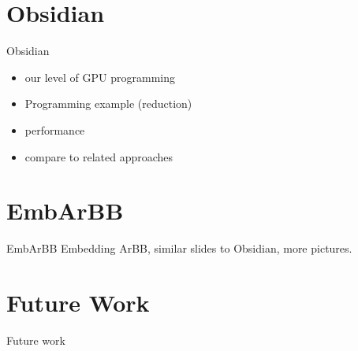 \documentclass[xcolor=dvipsnames]{beamer}
\begin{document}
%
\section{Obsidian}
\begin{frame}{Obsidian} 
  
  \begin{itemize} 
    \item our level of GPU programming 
    \item Programming example  (reduction) 
    \item performance 
    \item compare to related approaches 
  \end{itemize}
      
\end{frame} 

%
\section{EmbArBB} 

\begin{frame}{EmbArBB} 
  Embedding ArBB, similar slides to Obsidian, more pictures. 

\end{frame} 



%
\section{Future Work}
\begin{frame}{Future work} 

\end{frame} 
\end{document}
